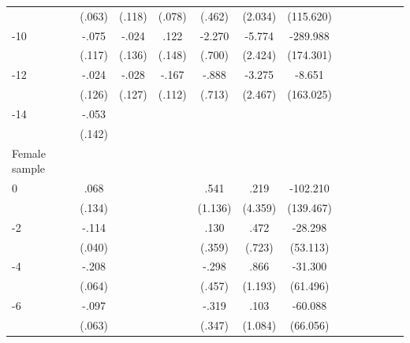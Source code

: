 \begin{table}[p]
\begin{adjustbox}{max width=\linewidth}
\begin{threeparttable}
{\begin{tabular}{l*{6}{S
S}}
                &   (.063)         &   (.118)         &   (.078)         &   (.462)         &  (2.034)         &(115.620)         \\
-10            &    -.075         &    -.024         &     .122         &   -2.270\sym{***}&   -5.774\sym{**} & -289.988\sym{*}  \\
                &   (.117)         &   (.136)         &   (.148)         &   (.700)         &  (2.424)         &(174.301)         \\
-12           &    -.024         &    -.028         &    -.167         &    -.888         &   -3.275         &   -8.651         \\
                &   (.126)         &   (.127)         &   (.112)         &   (.713)         &  (2.467)         &(163.025)         \\
-14           &    -.053         &                  &                  &                  &                  &                  \\
                &   (.142)         &                  &                  &                  &                  &                  \\
\midrule
Female sample &&&&&&\\
0               &     .068         &         &         &     .541         &     .219         & -102.210         \\
                &   (.134)         &         &         &  (1.136)         &  (4.359)         &(139.467)         \\
-2             &    -.114\sym{***}&         &         &     .130         &     .472         &  -28.298         \\
                &   (.040)         &         &         &   (.359)         &   (.723)         & (53.113)         \\
-4             &    -.208\sym{***}&         &         &    -.298         &     .866         &  -31.300         \\
                &   (.064)         &         &         &   (.457)         &  (1.193)         & (61.496)         \\
-6             &    -.097         &         &         &    -.319         &     .103         &  -60.088         \\
                &   (.063)         &         &         &   (.347)         &  (1.084)         & (66.056)         \\

\end{tabular}}
\end{threeparttable}
\end{adjustbox}
\end{table}

